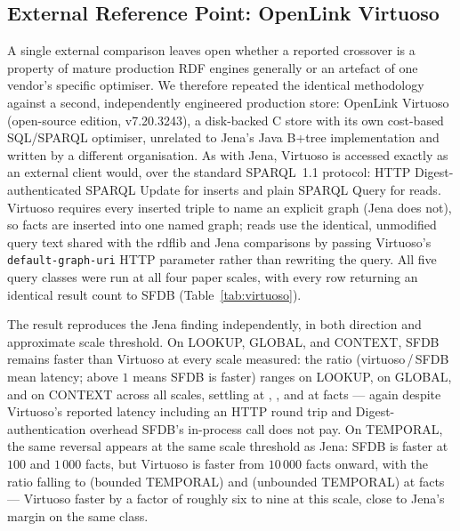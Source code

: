 \subsection{External Reference Point: OpenLink Virtuoso}
\label{sec:eval:virtuoso}

A single external comparison leaves open whether a reported crossover is
a property of mature production RDF engines generally or an artefact of
one vendor's specific optimiser. We therefore repeated the identical
methodology against a second, independently engineered production
store: OpenLink Virtuoso (open-source edition, v7.20.3243), a
disk-backed C store with its own cost-based SQL/SPARQL optimiser,
unrelated to Jena's Java B+tree implementation and written by a
different organisation. As with Jena, Virtuoso is accessed exactly as an
external client would, over the standard SPARQL~1.1 protocol: HTTP
Digest-authenticated SPARQL Update for inserts and plain SPARQL Query
for reads. Virtuoso requires every inserted triple to name an explicit
graph (Jena does not), so facts are inserted into one named graph;
reads use the identical, unmodified query text shared with the rdflib
and Jena comparisons by passing Virtuoso's \texttt{default-graph-uri}
HTTP parameter rather than rewriting the query. All five query classes
were run at all four paper scales, with every row returning an
identical result count to SFDB (Table~\ref{tab:virtuoso}).



The result reproduces the Jena finding independently, in both direction
and approximate scale threshold. On LOOKUP, GLOBAL, and CONTEXT, SFDB remains
faster than Virtuoso at every scale measured: the ratio
(virtuoso\,/\,SFDB mean latency; above $1$ means SFDB is faster) ranges
\rangelookupvirtuoso{} on LOOKUP, \rangeglobalvirtuoso{} on GLOBAL, and
\rangecontextvirtuoso{} on CONTEXT
across all scales, settling at \lookupvirtuosolarge{},
\globalvirtuosolarge{}, and \contextvirtuosolarge{} at \jenalargescale{} facts --- again despite
Virtuoso's reported latency including an HTTP round trip and
Digest-authentication overhead SFDB's in-process call does not pay. On
TEMPORAL, the same reversal appears at the same scale
threshold as Jena: SFDB is faster at $100$ and $1\,000$ facts, but
Virtuoso is faster from $10\,000$ facts onward, with the ratio falling to
\temporalvirtuosolarge{} (bounded
TEMPORAL) and \temporalunbvirtuosolarge{} (unbounded TEMPORAL) at
\jenalargescale{} facts --- Virtuoso faster by a factor of roughly six
to nine at this scale, close to Jena's margin on the same class.

